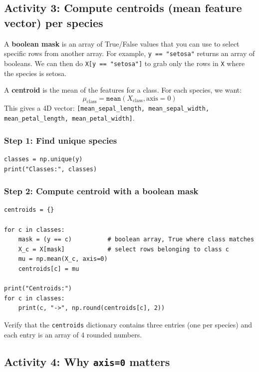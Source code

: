 \newpage
\subsection{Activity 3: Compute centroids (mean feature vector) per species}

A \textbf{boolean mask} is an array of True/False values that you can use to select specific rows from another array. For example, \texttt{y == "setosa"} returns an array of booleans. We can then do \texttt{X[y == "setosa"]} to grab only the rows in \texttt{X} where the species is setosa.

\noindent
A \textbf{centroid} is the mean of the features for a class. For each species, we want:
\[
    \mu_{\text{class}} = \texttt{mean}(X_{\text{class}}, \text{axis}=0)
\]
This gives a 4D vector:
\texttt{[mean\_sepal\_length, mean\_sepal\_width, mean\_petal\_length, mean\_petal\_width]}.

\subsubsection{Step 1: Find unique species}
\begin{verbatim}
classes = np.unique(y)
print("Classes:", classes)
\end{verbatim}

\subsubsection{Step 2: Compute centroid with a boolean mask}
\begin{verbatim}
centroids = {}

for c in classes:
    mask = (y == c)          # boolean array, True where class matches
    X_c = X[mask]            # select rows belonging to class c
    mu = np.mean(X_c, axis=0)
    centroids[c] = mu

print("Centroids:")
for c in classes:
    print(c, "->", np.round(centroids[c], 2))
\end{verbatim}

\begin{tcolorbox}[title=Checkpoint]
Verify that the \texttt{centroids} dictionary contains three entries (one per species) and each entry is an array of 4 rounded numbers.
\end{tcolorbox}

\newpage
\subsection{Activity 4: Why \texttt{axis=0} matters}

